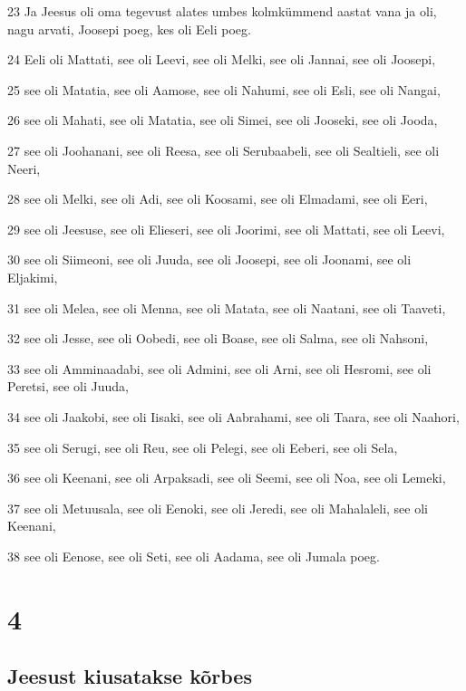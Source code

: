 \par 23 Ja Jeesus oli oma tegevust alates umbes kolmkümmend aastat vana ja oli, nagu arvati, Joosepi poeg, kes oli Eeli poeg.
\par 24 Eeli oli Mattati, see oli Leevi, see oli Melki, see oli Jannai, see oli Joosepi,
\par 25 see oli Matatia, see oli Aamose, see oli Nahumi, see oli Esli, see oli Nangai,
\par 26 see oli Mahati, see oli Matatia, see oli Simei, see oli Jooseki, see oli Jooda,
\par 27 see oli Joohanani, see oli Reesa, see oli Serubaabeli, see oli Sealtieli, see oli Neeri,
\par 28 see oli Melki, see oli Adi, see oli Koosami, see oli Elmadami, see oli Eeri,
\par 29 see oli Jeesuse, see oli Elieseri, see oli Joorimi, see oli Mattati, see oli Leevi,
\par 30 see oli Siimeoni, see oli Juuda, see oli Joosepi, see oli Joonami, see oli Eljakimi,
\par 31 see oli Melea, see oli Menna, see oli Matata, see oli Naatani, see oli Taaveti,
\par 32 see oli Jesse, see oli Oobedi, see oli Boase, see oli Salma, see oli Nahsoni,
\par 33 see oli Amminaadabi, see oli Admini, see oli Arni, see oli Hesromi, see oli Peretsi, see oli Juuda,
\par 34 see oli Jaakobi, see oli Iisaki, see oli Aabrahami, see oli Taara, see oli Naahori,
\par 35 see oli Serugi, see oli Reu, see oli Pelegi, see oli Eeberi, see oli Sela,
\par 36 see oli Keenani, see oli Arpaksadi, see oli Seemi, see oli Noa, see oli Lemeki,
\par 37 see oli Metuusala, see oli Eenoki, see oli Jeredi, see oli Mahalaleli, see oli Keenani,
\par 38 see oli Eenose, see oli Seti, see oli Aadama, see oli Jumala poeg.


\chapter{4}

\section*{Jeesust kiusatakse kõrbes}

